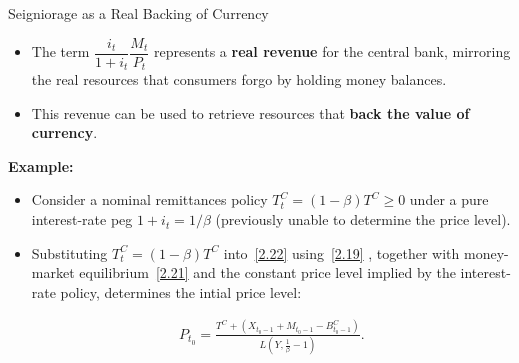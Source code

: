 \documentclass[11pt,aspectratio=169]{beamer}
\begin{document}
\begin{frame}{Seigniorage as a Real Backing of Currency}
\small
\begin{itemize}
    \item The term $\dfrac{i_t}{1+i_t}\dfrac{M_t}{P_t}$ represents a \textbf{real revenue} for the central bank, mirroring the real resources that consumers forgo by holding money balances. 
    \vspace{0.3em}

    \item This revenue can be used to retrieve resources that \textbf{back the value of currency}. 
\end{itemize}

\vspace{0.3em}
\textbf{Example:}
\begin{itemize}
    \item Consider a nominal remittances policy 
    $T_t^C=(1-\beta)T^C \ge 0$
    under a pure interest-rate peg $1+i_t=1/\beta$ 
    (previously unable to determine the price level). 
    \vspace{0.6em}

    \item Substituting $T_t^C=(1-\beta)T^C$ into~\eqref{2.22} using~\eqref{2.19} , together with money-market equilibrium~\eqref{2.21} and the constant price level implied by the interest-rate policy, determines the intial price level:

\begin{align}
    P_{t_0}
    = \frac{
        T^C + (X_{t_0-1} + M_{t_0-1} - B_{t_0-1}^{C})
      }{
        L\!\left(Y,\tfrac{1}{\beta}-1\right)
      }.
\label{2.24}
\end{align}
\end{itemize}

\end{frame}
\end{document}

